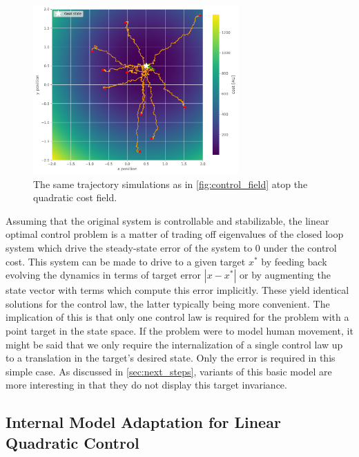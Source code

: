 \documentclass[
  a4paper,
]{article}
\begin{document}
\begin{figure}
\hypertarget{fig:cost_field}{%
\centering
\includegraphics[width=0.7\textwidth,height=\textheight]{images/simulations/cost_field.pdf}
\caption{The same trajectory simulations as in \cref{fig:control_field}
atop the quadratic cost field.}\label{fig:cost_field}
}
\end{figure}

Assuming that the original system is controllable and stabilizable, the
linear optimal control problem is a matter of trading off eigenvalues of
the closed loop system which drive the steady-state error of the system
to 0 under the control cost. This system can be made to drive to a given
target \(x^*\) by feeding back evolving the dynamics in terms of target
error \(|x-x^*|\) or by augmenting the state vector with terms which
compute this error implicitly. These yield identical solutions for the
control law, the latter typically being more convenient. The implication
of this is that only one control law is required for the problem with a
point target in the state space. If the problem were to model human
movement, it might be said that we only require the internalization of a
single control law up to a translation in the target's desired state.
Only the error is required in this simple case. As discussed in
\cref{sec:next_steps}, variants of this basic model are more interesting
in that they do not display this target invariance.

\hypertarget{internal-model-adaptation-for-linear-quadratic-control}{%
\subsection{Internal Model Adaptation for Linear Quadratic
Control}\label{internal-model-adaptation-for-linear-quadratic-control}}
\end{document}
